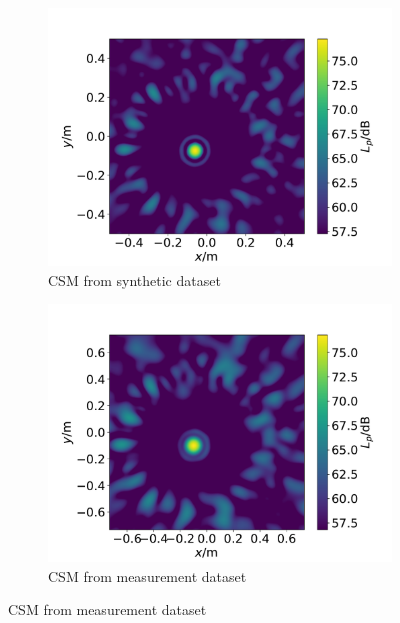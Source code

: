 \documentclass[11pt,a4paper,twoside]{report}
\begin{document}
\begin{figure}
    \centering
    \begin{subfigure}{0.45\textwidth}
        \centering
        \includegraphics[width=1.3\textwidth]{figs/datasets_beamforming_example_synthetic.pdf}
        \caption{CSM from synthetic dataset}
        \label{fig:data_augmentation_evecs_synthetic}
    \end{subfigure}
    \hfill
    \begin{subfigure}{0.45\textwidth}
        \centering
        \includegraphics[width=1.3\textwidth]{figs/datasets_beamforming_example_measurement.pdf}
        \caption{CSM from measurement dataset}
        \label{fig:data_augmentation_evecs_measurement}
    \end{subfigure}

\end{figure}
\end{document}
